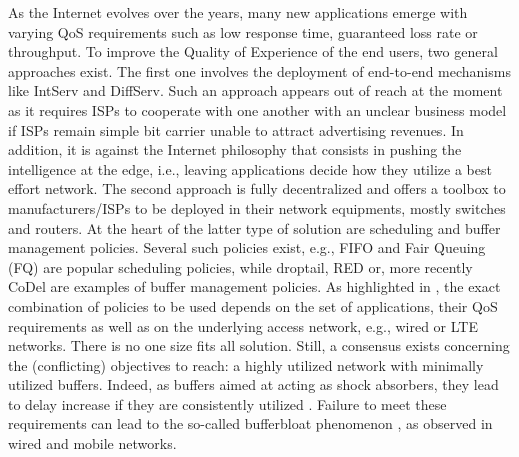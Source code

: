 \documentclass[preprint,12pt]{elsarticle}
\begin{document}
As the Internet evolves over the years, many  new applications emerge with varying QoS requirements such as low response time, guaranteed loss rate or throughput. To improve the Quality of Experience of the end users, two general approaches exist. The first one involves the deployment of end-to-end mechanisms like IntServ and DiffServ.  Such an approach appears out of reach at the moment as it requires ISPs to cooperate with one another with an unclear business model if ISPs remain simple bit carrier unable to attract advertising revenues. In addition, it is against the Internet philosophy that consists in pushing the intelligence at the edge, i.e., leaving applications decide how they utilize a best effort network. The second approach is fully decentralized and offers a toolbox to manufacturers/ISPs to be deployed in their network equipments, mostly switches and routers.  At the heart of the latter type of solution are scheduling and buffer management policies. Several such policies exist, e.g., FIFO and Fair Queuing (FQ) are popular scheduling policies, while droptail, RED \cite{Floyd93} or, more recently CoDel \cite{Jacobson12} are examples of buffer management policies. As highlighted in \cite{sivaraman2013no}, the exact combination of policies to be used depends on the set of applications, their QoS requirements as well as on the underlying access network, e.g., wired or LTE networks. There is no one size fits all solution. Still, a consensus exists concerning the (conflicting) objectives to reach: a highly utilized network with minimally utilized buffers. Indeed, as buffers aimed at acting as shock absorbers, they lead to delay increase if they are consistently utilized \cite{Jacobson12}. Failure to meet these requirements can lead to the so-called bufferbloat phenomenon \cite{Gettys12}, as observed in wired and mobile networks\cite{BufferBloat_IMC_2012}.
\end{document}
